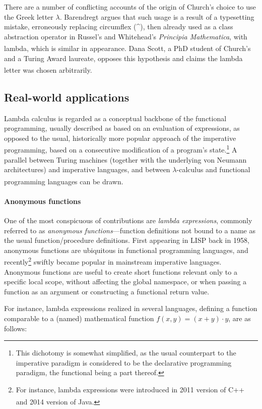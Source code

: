 \documentclass[table, a4paper, 10pt]{article}
\newcommand{\cit}[1]{\textsuperscript{\cite{#1}}}
\begin{document}
There are a number of conflicting accounts of the origin of Church's choice
to use the Greek letter $\lambda$. Barendregt argues that such usage
is a result of a typesetting mistake, erroneously replacing circumflex (\^{}),
then already used as a class abstraction operator in Russel's and Whitehead's
\textit{Principia Mathematica}, with lambda, which is similar in appearance.\cit{barenImpact}
Dana Scott, a PhD student of Church's and a Turing Award laureate, opposes this
hypothesis and claims the lambda letter was chosen arbitrarily.\cit{scottLecture}

\subsection{Real-world applications}
Lambda calculus is regarded as a conceptual backbone of the
functional programming, usually described as based on an evaluation
of expressions, as opposed to the usual, historically more popular approach of
the imperative programming, based on a consecutive modification of a program's state.\footnote{This dichotomy is somewhat simplified, as the usual counterpart
to the imperative paradigm is considered to be the declarative programming paradigm, the functional being a part thereof.}
A parallel between Turing machines (together with the underlying von Neumann architectures) and imperative languages, and between $\lambda$-calculus
and functional programming languages can be drawn.\cit{baren94}

\paragraph{Anonymous functions}
One of the most conspicuous of contributions are \textit{lambda expressions}, commonly
referred to as \textit{anonymous functions}---function
definitions not bound to a name as the usual function/procedure definitions.
First appearing in LISP back in 1958, anonymous functions are
ubiquitous in functional programming languages, and recently\footnote{For instance, lambda expressions were introduced
in 2011 version of C++ and 2014 version of Java.\cit{cppRef}\cit{oracleRef}} swiftly became popular 
in mainstream imperative languages.
Anonymous functions are useful to create short functions relevant only to a
specific local scope, without affecting the global namespace, or when passing
a function as an argument or constructing a functional return value.

For instance, lambda expressions realized in several languages, defining a function
comparable to a (named) mathematical function $f(x,y) = (x+y) \cdot y$, are as follows:
\end{document}
